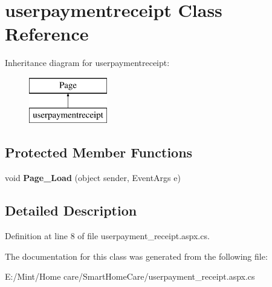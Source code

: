 \hypertarget{classuserpaymentreceipt}{\section{userpaymentreceipt Class Reference}
\label{classuserpaymentreceipt}
}
Inheritance diagram for userpaymentreceipt\-:\begin{figure}[H]
\begin{center}
\leavevmode
\includegraphics[height=2.000000cm]{classuserpaymentreceipt}
\end{center}
\end{figure}
\subsection*{Protected Member Functions}
\begin{DoxyCompactItemize}
\item 
\hypertarget{classuserpaymentreceipt_a36415d33969c5f0f6a3fd9979641f876}{void {\bfseries Page\-\_\-\-Load} (object sender, Event\-Args e)}\label{classuserpaymentreceipt_a36415d33969c5f0f6a3fd9979641f876}

\end{DoxyCompactItemize}


\subsection{Detailed Description}


Definition at line 8 of file userpayment\-\_\-receipt.\-aspx.\-cs.



The documentation for this class was generated from the following file\-:\begin{DoxyCompactItemize}
\item 
E\-:/\-Mint/\-Home care/\-Smart\-Home\-Care/userpayment\-\_\-receipt.\-aspx.\-cs\end{DoxyCompactItemize}
